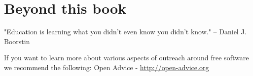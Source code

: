 \chapter{Beyond this book}
"Education is learning what you didn't even know you didn't know." -- Daniel J. Boorstin

If you want to learn more about various aspects of outreach around free software we recommend the following:
Open Advice - \url{http://open-advice.org}
